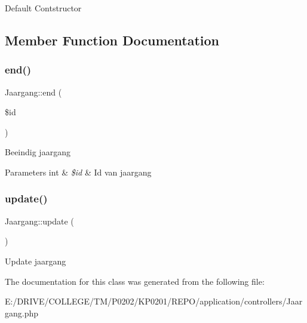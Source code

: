 Default Contstructor 

\subsection{Member Function Documentation}
\mbox{\label{class_jaargang_a3186482529d41140d9367fb78cd1b119}} 
\subsubsection{\texorpdfstring{end()}{end()}}
{\footnotesize\ttfamily Jaargang\+::end (\begin{DoxyParamCaption}\item[{}]{\$id }\end{DoxyParamCaption})}

Beeindig jaargang 
\begin{DoxyParams}[1]{Parameters}
int & {\em \$id} & Id van jaargang \\
\hline
\end{DoxyParams}
\mbox{\label{class_jaargang_aaa73e406504c88e78c151e120f2e1097}} 
\subsubsection{\texorpdfstring{update()}{update()}}
{\footnotesize\ttfamily Jaargang\+::update (\begin{DoxyParamCaption}{ }\end{DoxyParamCaption})}

Update jaargang 

The documentation for this class was generated from the following file\+:\begin{DoxyCompactItemize}
\item 
E\+:/\+D\+R\+I\+V\+E/\+C\+O\+L\+L\+E\+G\+E/\+T\+M/\+P0202/\+K\+P0201/\+R\+E\+P\+O/application/controllers/Jaargang.\+php\end{DoxyCompactItemize}
